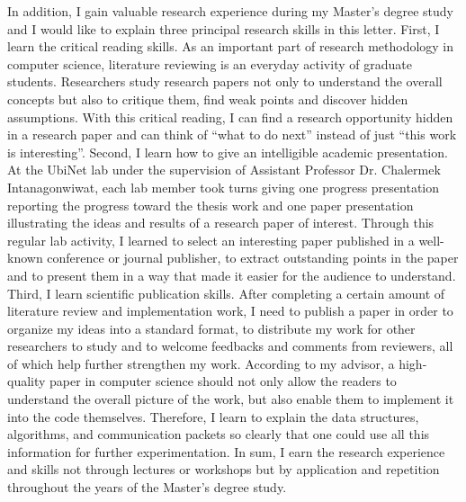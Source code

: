 \documentclass[a4paper,10pt]{report}
\begin{document}
\vspace{0.2cm}
In addition, I gain valuable research experience during my Master's degree study and I would like to explain three principal research skills in this letter. First, I learn the critical reading skills. As an important part of research methodology in computer science, literature reviewing is an everyday activity of graduate students. Researchers study research papers not only to understand the overall concepts but also to critique them, find weak points and discover hidden assumptions. With this critical reading, I can find a research opportunity hidden in a research paper and can think of ``what to do next'' instead of just ``this work is interesting''. Second, I learn how to give an intelligible academic presentation. At the UbiNet lab under the supervision of Assistant Professor Dr. Chalermek Intanagonwiwat, each lab member took turns giving one progress presentation reporting the progress toward the thesis work and one paper presentation illustrating the ideas and results of a research paper of interest. Through this regular lab activity, I learned to select an interesting paper published in a well-known conference or journal publisher, to extract outstanding points in the paper and to present them in a way that made it easier for the audience to understand. Third, I learn scientific publication skills. After completing a certain amount of literature review and implementation work, I need to publish a paper in order to organize my ideas into a standard format, to distribute my work for other researchers to study and to welcome feedbacks and comments from reviewers, all of which help further strengthen my work. According to my advisor, a high-quality paper in computer science should not only allow the readers to understand the overall picture of the work, but also enable them to implement it into the code themselves. Therefore, I learn to explain the data structures, algorithms, and communication packets so clearly that one could use all this information for further experimentation. In sum, I earn the research experience and skills not through lectures or workshops but by application and repetition throughout the years of the Master's degree study.
\end{document}
